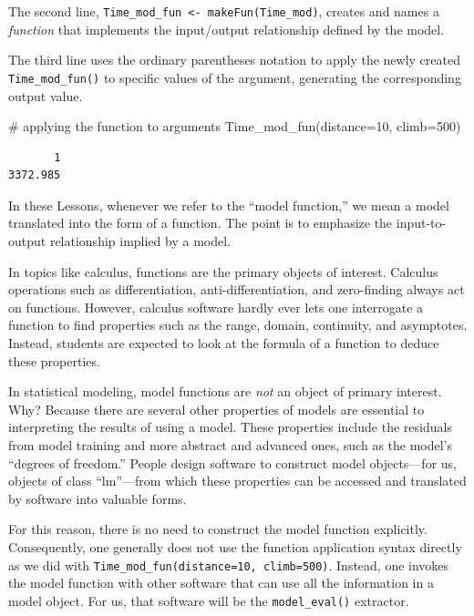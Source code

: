 \documentclass[
  letterpaper,
  DIV=11,
  numbers=noendperiod,
  oneside]{scrreprt}
\newenvironment{Shaded}{\begin{snugshade}}{\end{snugshade}}
\newcommand{\AttributeTok}[1]{\textcolor[rgb]{0.40,0.45,0.13}{#1}}
\newcommand{\CommentTok}[1]{\textcolor[rgb]{0.37,0.37,0.37}{#1}}
\newcommand{\DecValTok}[1]{\textcolor[rgb]{0.68,0.00,0.00}{#1}}
\newcommand{\FunctionTok}[1]{\textcolor[rgb]{0.28,0.35,0.67}{#1}}
\newcommand{\NormalTok}[1]{\textcolor[rgb]{0.00,0.23,0.31}{#1}}
\begin{document}
The second line,
\texttt{Time\_mod\_fun\ \textless{}-\ makeFun(Time\_mod)}, creates and
names a \emph{function} that implements the input/output relationship
defined by the model.

The third line uses the ordinary parentheses notation to apply the newly
created \texttt{Time\_mod\_fun()} to specific values of the argument,
generating the corresponding output value.

\begin{Shaded}
\begin{Highlighting}[]
\CommentTok{\# applying the function to arguments}
\FunctionTok{Time\_mod\_fun}\NormalTok{(}\AttributeTok{distance=}\DecValTok{10}\NormalTok{, }\AttributeTok{climb=}\DecValTok{500}\NormalTok{) }
\end{Highlighting}
\end{Shaded}

\begin{verbatim}
       1 
3372.985 
\end{verbatim}

In these Lessons, whenever we refer to the ``model function,'' we mean a
model translated into the form of a function. The point is to emphasize
the input-to-output relationship implied by a model.

In topics like calculus, functions are the primary objects of interest.
Calculus operations such as differentiation, anti-differentiation, and
zero-finding always act on functions. However, calculus software hardly
ever lets one interrogate a function to find properties such as the
range, domain, continuity, and asymptotes. Instead, students are
expected to look at the formula of a function to deduce these
properties.

In statistical modeling, model functions are \emph{not} an object of
primary interest. Why? Because there are several other properties of
models are essential to interpreting the results of using a model. These
properties include the residuals from model training and more abstract
and advanced ones, such as the model's ``degrees of freedom.'' People
design software to construct model objects---for us, objects of class
``lm''---from which these properties can be accessed and translated by
software into valuable forms.

For this reason, there is no need to construct the model function
explicitly. Consequently, one generally does not use the function
application syntax directly as we did with
\texttt{Time\_mod\_fun(distance=10,\ climb=500)}. Instead, one invokes
the model function with other software that can use all the information
in a model object. For us, that software will be the
\texttt{model\_eval()} extractor.
\end{document}
